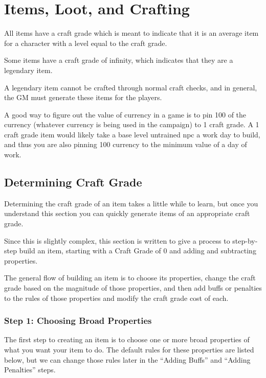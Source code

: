 \chapter{Items, Loot, and Crafting}

All items have a craft grade which is meant to indicate that it is an average item for a character with a level equal to the craft grade.

Some items have a craft grade of infinity, which indicates that they are a legendary item.

A legendary item cannot be crafted through normal craft checks, and in general, the GM must generate these items for the players.

A good way to figure out the value of currency in a game is to pin 100 of the currency (whatever currency is being used in the campaign) to 1 craft grade. A 1 craft grade item would likely take a base level untrained npc a work day to build, and thus you are also pinning 100 currency to the minimum value of a day of work.

\section{Determining Craft Grade}

Determining the craft grade of an item takes a little while to learn, but once you understand this section you can quickly generate items of an appropriate craft grade.

Since this is slightly complex, this section is written to give a process to step-by-step build an item, starting with a Craft Grade of 0 and adding and subtracting properties.

The general flow of building an item is to choose its properties, change the craft grade based on the magnitude of those properties, and then add buffs or penalties to the rules of those properties and modify the craft grade cost of each.

\subsection{Step 1: Choosing Broad Properties}
The first step to creating an item is to choose one or more broad properties of what you want your item to do. The default rules for these properties are listed below, but we can change those rules later in the ``Adding Buffs'' and ``Adding Penalties'' steps.

